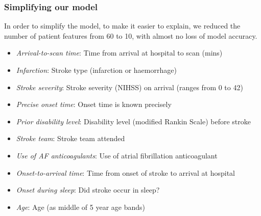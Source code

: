 \begin{frame}
\frametitle{Simplifying our model}

In order to simplify the model, to make it easier to explain, we reduced the number of patient features from 60 to 10, with almost no loss of model accuracy.

\small
\begin{itemize}
    \item \emph{Arrival-to-scan time}: Time from arrival at hospital to scan (mins)
    \item \emph{Infarction}: Stroke type (infarction or haemorrhage)
    \item \emph{Stroke severity}: Stroke severity (NIHSS) on arrival (ranges from 0 to 42)
    \item \emph{Precise onset time}: Onset time is known precisely
    \item \emph{Prior disability level}: Disability level (modified Rankin Scale) before stroke
    \item \emph{Stroke team}: Stroke team attended
    \item \emph{Use of AF anticoagulants}: Use of atrial fibrillation anticoagulant
    \item \emph{Onset-to-arrival time}: Time from onset of stroke to arrival at hospital
    \item \emph{Onset during sleep}: Did stroke occur in sleep?
    \item \emph{Age}: Age (as middle of 5 year age bands)
\end{itemize}
\end{frame}